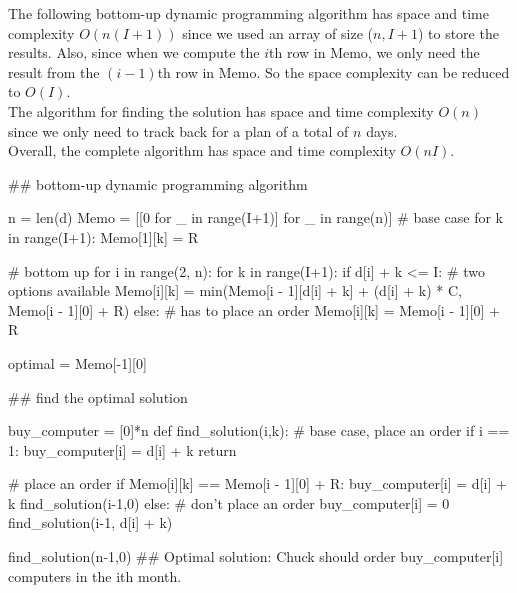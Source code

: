 \documentclass{article}
\begin{document}
\begin{tcolorbox}
The following bottom-up dynamic programming algorithm has space and time complexity $O(n(I+1))$ since we used an array of size ($n, I+1$) to store the results. Also, since when we compute the $i$th row in Memo, we only need the result from the $(i-1)$th row in Memo. So the space complexity can be reduced to $O(I)$.\\
The algorithm for finding the solution has space and time complexity $O(n)$ since we only need to track back for a plan of a total of $n$ days. \\
Overall, the complete algorithm has space and time complexity $O(nI)$.

\begin{python}
## bottom-up dynamic programming algorithm

n = len(d)
Memo = [[0 for _ in range(I+1)] for _ in range(n)]
# base case
for k in range(I+1):
    Memo[1][k] = R

# bottom up
for i in range(2, n):
    for k in range(I+1):
        if d[i] + k <= I:
        # two options available
            Memo[i][k] = min(Memo[i - 1][d[i] + k] + (d[i] + k) * C, Memo[i - 1][0] + R)
        else:
        # has to place an order
            Memo[i][k] = Memo[i - 1][0] + R

optimal = Memo[-1][0]
\end{python}
\end{tcolorbox}

\begin{tcolorbox}
\begin{python}
## find the optimal solution

buy_computer = [0]*n
def find_solution(i,k):
    # base case, place an order
    if i == 1:       
        buy_computer[i] = d[i] + k
        return 
        
    # place an order 
    if Memo[i][k] == Memo[i - 1][0] + R:
        buy_computer[i] = d[i] + k
        find_solution(i-1,0)
    else:
    # don't place an order
        buy_computer[i] = 0
        find_solution(i-1, d[i] + k)

find_solution(n-1,0)
## Optimal solution: Chuck should order buy_computer[i] computers in the ith month.
\end{python}

\end{tcolorbox}
\end{document}
